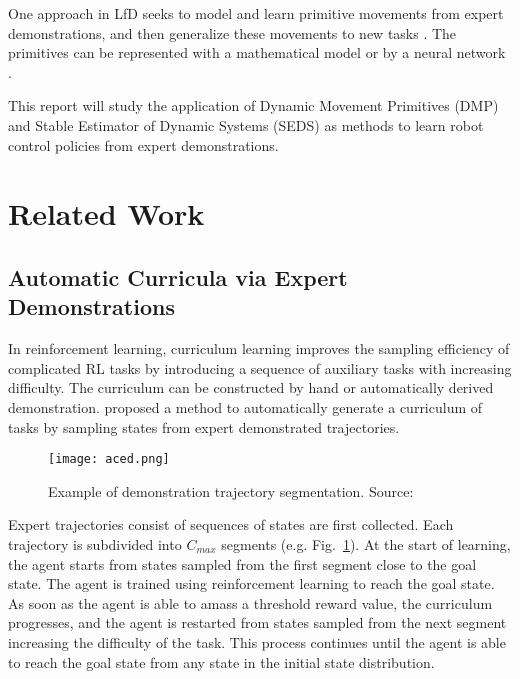 \documentclass[conference]{IEEEtran}
\begin{document}
One approach in LfD seeks to model and learn primitive movements from expert demonstrations, and then generalize these movements to new tasks \cite{maedaLearningInteractionCollaborative2014}. The primitives can be represented with a mathematical model \cite{ijspeertTrajectoryFormationImitation2001} or by a neural network \cite{merelNeuralProbabilisticMotor2019}.

This report will study the application of Dynamic Movement Primitives (DMP) \cite{ijspeertTrajectoryFormationImitation2001} and Stable Estimator of Dynamic Systems (SEDS) \cite{khansari-zadehLearningStableNonlinear2011} as methods to learn robot control policies from expert demonstrations.

\section{Related Work}

\subsection{Automatic Curricula via Expert Demonstrations}

In reinforcement learning, curriculum learning improves the sampling efficiency of complicated RL tasks by introducing a sequence of auxiliary tasks with increasing difficulty. The curriculum can be constructed by hand or automatically derived demonstration. \cite{maedaLearningInteractionCollaborative2014} proposed a method to automatically generate a curriculum of tasks by sampling states from expert demonstrated trajectories.

\begin{figure}
    \centering
    \texttt{[image: aced.png]}
    \caption{Example of demonstration trajectory segmentation. Source: \cite{daiAutomaticCurriculaExpert2022}}
    \label{fig:curriculum}
\end{figure}

Expert trajectories consist of sequences of states are first collected. Each trajectory is subdivided into $C_{max}$ segments (e.g. Fig.~\ref{fig:curriculum}). At the start of learning, the agent starts from states sampled from the first segment close to the goal state. The agent is trained using reinforcement learning to reach the goal state. As soon as the agent is able to amass a threshold reward value, the curriculum progresses, and the agent is restarted from states sampled from the next segment increasing the difficulty of the task. This process continues until the agent is able to reach the goal state from any state in the initial state distribution.
\end{document}
